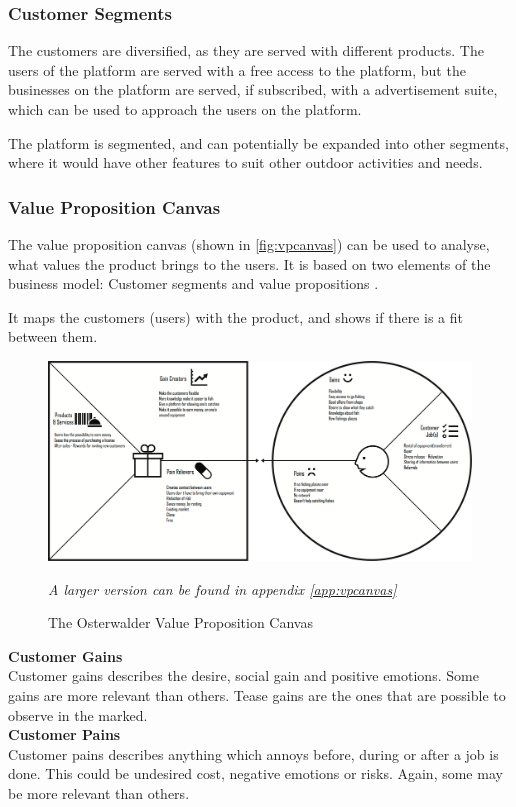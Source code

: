 \subsubsection{Customer Segments}
The customers are diversified, as they are served with different products. The users of the platform are served with a free access to the platform, but the businesses on the platform are served, if subscribed, with a advertisement suite, which can be used to approach the users on the platform.

The platform is segmented, and can potentially be expanded into other segments, where it would have other features to suit other outdoor activities and needs.

\subsubsection{Value Proposition Canvas}
The value proposition canvas (shown in \autoref{fig:vpcanvas}) can be used to analyse, what values the product brings to the users. It is based on two elements of the business model: Customer segments and value propositions \cite{vpcanvas}. 

It maps the customers (users) with the product, and shows if there is a fit between them.
\begin{figure}[H]
  \centering
  \includegraphics[width=.45\textwidth]{images/value_proposition_canvas.png}
  \caption{The Osterwalder Value Proposition Canvas}
  \label{fig:vpcanvas}
  \footnotesize{\textit{A larger version can be found in appendix \ref{app:vpcanvas}}}
\end{figure}

{\noindent \textbf{Customer Gains\\}}
Customer gains describes the desire, social gain and positive emotions. Some gains are more relevant than others. Tease gains are the ones that are possible to observe in the marked.\\
  
{\noindent \textbf{Customer Pains\\}}
Customer pains describes anything which annoys before, during or after a job is done. This could be undesired cost, negative emotions or risks. Again, some may be more relevant than others. \\


